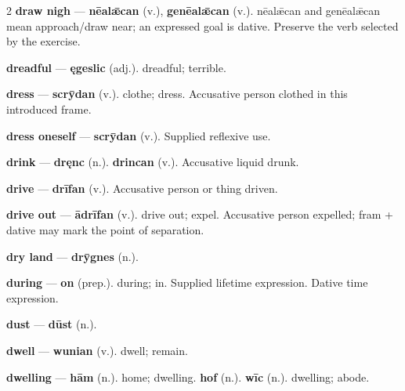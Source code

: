 \begin{multicols}{2}
\textbf{draw nigh} — \textbf{nēalǣcan} (v.), \textbf{genēalǣcan} (v.). nēalǣcan and genēalǣcan mean approach/draw near; an expressed goal is dative. Preserve the verb selected by the exercise.\par
\textbf{dreadful} — \textbf{ęgeslic} (adj.). dreadful; terrible.\par
\textbf{dress} — \textbf{scrȳdan} (v.). clothe; dress. Accusative person clothed in this introduced frame.\par
\textbf{dress oneself} — \textbf{scrȳdan} (v.). Supplied reflexive use.\par
\textbf{drink} — \textbf{dręnc} (n.).  \textbf{drincan} (v.). Accusative liquid drunk.\par
\textbf{drive} — \textbf{drīfan} (v.). Accusative person or thing driven.\par
\textbf{drive out} — \textbf{ādrīfan} (v.). drive out; expel. Accusative person expelled; fram + dative may mark the point of separation.\par
\textbf{dry land} — \textbf{drȳgnes} (n.).\par
\textbf{during} — \textbf{on} (prep.). during; in. Supplied lifetime expression. Dative time expression.\par
\textbf{dust} — \textbf{dūst} (n.).\par
\textbf{dwell} — \textbf{wunian} (v.). dwell; remain.\par
\textbf{dwelling} — \textbf{hām} (n.). home; dwelling. \textbf{hof} (n.).  \textbf{wīc} (n.). dwelling; abode.\par

\end{multicols}
